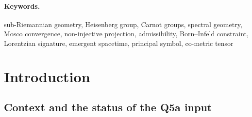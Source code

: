 \documentclass[11pt,a4paper]{article}
\theoremstyle{definition}
\theoremstyle{remark}
\begin{document}
  \paragraph{Keywords.}
    sub-Riemannian geometry, Heisenberg group, Carnot groups, spectral geometry,
    Mosco convergence, non-injective projection, admissibility, Born–Infeld constraint,
    Lorentzian signature, emergent spacetime, principal symbol, co-metric tensor

    \clearpage
    \tableofcontents

    \clearpage
  \section{Introduction}
  \label{sec:intro}

  \subsection{Context and the status of the Q5a input}
\end{document}
